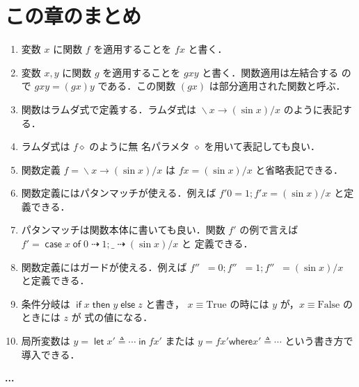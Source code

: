 \documentclass[a5paper,twoside,fleqn]{jsbook}
\newcommand{\programminglanguage}[1]{\textsf{#1}}
\newcommand{\clang}{\programminglanguage{C}}
\newcommand{\haskell}{\programminglanguage{Haskell}}
\newenvironment{note}[1]{\begin{boxnote}\begin{center}\textbf{#1}\end{center}}{\end{boxnote}}
\newcommand{\code}[1]{\texttt{#1}}
\newenvironment{ccode}{\begin{itembox}[r]{\clang}}{\end{itembox}}
\newcommand{\mKeyword}[1]{\mathsf{#1}} %
\newcommand{\mIfKeyword}{\mKeyword{if}}
\newcommand{\mCaseKeyword}{\mKeyword{case}}
\newcommand{\mElseKeyword}{\mKeyword{else}}
\newcommand{\mInKeyword}{\mKeyword{in}}
\newcommand{\mLetKeyword}{\mKeyword{let}}
\newcommand{\mOfKeyword}{\mKeyword{of}}
\newcommand{\mOtherwiseKeyword}{\mKeyword{otherwise}}
\newcommand{\mThenKeyword}{\mKeyword{then}}
\newcommand{\mWhereKeyword}{\mKeyword{where}}
\DeclareMathOperator{\mCaseKW}{\mCaseKeyword} %
\DeclareMathOperator{\mElse}{\mElseKeyword}
\DeclareMathOperator{\mIf}{\mIfKeyword}
\DeclareMathOperator{\mInKW}{\mInKeyword} %
\DeclareMathOperator{\mLetKW}{\mLetKeyword} %
\DeclareMathOperator{\mOfKW}{\mOfKeyword} %
\DeclareMathOperator{\mOtherwise}{\mOtherwiseKeyword}
\DeclareMathOperator{\mThen}{\mThenKeyword}
\newcommand{\mSpecialConstant}[1]{\textrm{#1}} %
\newcommand{\mFalse}{\mSpecialConstant{False}}
\newcommand{\mTrue}{\mSpecialConstant{True}}
\newcommand{\mAnyParam}{\_}
\newcommand{\mAnonParam}{\diamond}
\DeclareMathOperator{\mIfSo}{\dashrightarrow}
\DeclareMathOperator{\mLambda}{\backslash}
\DeclareMathOperator{\mLambdaArrow}{\rightarrow}
\DeclareMathOperator{\mLetEq}{\triangleq}
\newcommand{\mGuard}[1]{\mathop{\mid_{#1}}}
\newcommand{\mCaseOf}[1]{\mCaseKW#1\mOfKW}
\newcommand{\mIfThenElse}[3]{\mIf{#1}\mThen{#2}\mElse{#3}}
\newcommand{\mLambdaExp}[2]{\mLambda{#1}\mLambdaArrow{#2}}
\newcommand{\mLetIn}[3]{\mLetKW#1\mLetEq#2\mInKW{#3}}
\newcommand{\mWhereIs}[2]{\mathbin{\mWhereKeyword}#1\mLetEq#2}
\begin{document}
\section{この章のまとめ}

\begin{enumerate}
\item 変数 $x$ に関数 $f$ を適用することを $fx$ と書く．\item 変数
  $x,y$ に関数 $g$ を適用することを $gxy$ と書く．関数適用は左結合する
  ので $gxy=(gx)y$ である．この関数 $(gx)$ は部分適用された関数と呼ぶ．
\item 関数はラムダ式で定義する．ラムダ式は $\mLambdaExp{x}{(\sin
  x)/x}$ のように表記する．\item ラムダ式は $f\mAnonParam$ のように無
  名パラメタ $\mAnonParam$ を用いて表記しても良い．\item 関数定義
  $f=\mLambdaExp{x}{(\sin x)/x}$ は $fx=(\sin x)/x$ と省略表記できる．
\item 関数定義にはパタンマッチが使える．例えば $f'0=1;f'x=(\sin x)/x$
  と定義できる．\item パタンマッチは関数本体に書いても良い．関数 $f'$
  の例で言えば $f'=\mCaseOf{x}0\mIfSo1;\mAnyParam\mIfSo(\sin x)/x$ と
  定義できる．\item 関数定義にはガードが使える．例えば
  $f''\mGuard{x<0}=0;f''\mGuard{x\equiv0}=1;f''\mGuard{\mOtherwise}=(\sin
  x)/x$ と定義できる．\item 条件分岐は $\mIfThenElse{x}{y}{z}$ と書き，
  $x\equiv\mTrue$ の時には $y$ が，$x\equiv\mFalse$ のときには $z$ が
  式の値になる．\item 局所変数は $y=\mLetIn{x'}{\dotsb}{fx'}$ または
  $y=fx'\mWhereIs{x'}{\dotsb}$ という書き方で導入できる．
\end{enumerate}



\begin{note}{...}%
\end{note}
\end{document}
